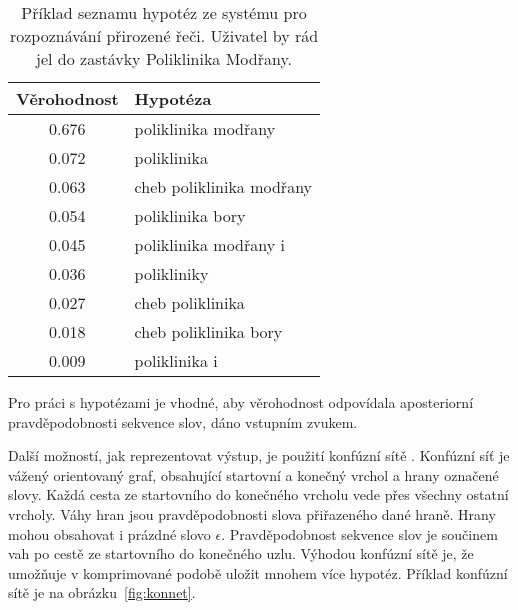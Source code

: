 \begin{table}[h]
\begin{center}
\begin{tabular}{|c|l|}
\hline
Věrohodnost & Hypotéza \\
\hline
\hline
0.676 & poliklinika modřany\\
\hline
0.072 & poliklinika\\
\hline
0.063 & cheb poliklinika modřany\\
\hline
0.054 & poliklinika bory\\
\hline
0.045 & poliklinika modřany i\\
\hline
0.036 & polikliniky\\
\hline
0.027 & cheb poliklinika\\
\hline
0.018 & cheb poliklinika bory\\
\hline
0.009 & poliklinika i\\
\hline
\end{tabular}
\end{center}
\caption{Příklad seznamu hypotéz ze systému pro rozpoznávání přirozené řeči.
Uživatel by rád jel do zastávky Poliklinika Modřany.}
\label{tab:sezhyp}
\end{table}

Pro práci s hypotézami je vhodné, aby věrohodnost odpovídala aposteriorní pravděpodobnosti sekvence slov, dáno vstupním zvukem.

Další možností, jak reprezentovat výstup, je použití konfúzní sítě \cite{bertoldi2005new}.
Konfúzní síť je vážený orientovaný graf, obsahující startovní a konečný vrchol a hrany označené slovy.
Každá cesta ze startovního do konečného vrcholu vede přes všechny ostatní vrcholy.
Váhy hran jsou pravděpodobnosti slova přiřazeného dané hraně.
Hrany mohou obsahovat i prázdné slovo $\epsilon$.
Pravděpodobnost sekvence slov je součinem vah po cestě ze startovního do konečného uzlu.
Výhodou konfúzní sítě je, že umožňuje v komprimované podobě uložit mnohem více hypotéz.
Příklad konfúzní sítě je na obrázku~\ref{fig:konnet}.

